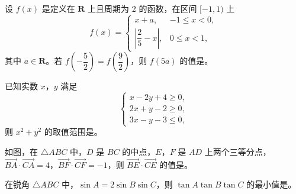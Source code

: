 \begin{question}
设 \(f(x)\) 是定义在 \(\mathbf{R}\) 上且周期为 2 的函数，在区间 \([-1,1)\) 上
\nopagebreak[4]
\[
f(x)=
\begin{cases}
x+a, & -1\leqslant x<0,\\
\left|\dfrac{2}{5}-x\right|, & 0\leqslant x<1,
\end{cases}
\]
其中 \(a\in\mathbf{R}\)。若 \(f\left(-\dfrac{5}{2}\right)=f\left(\dfrac{9}{2}\right)\)，则 \(f(5a)\) 的值是\gkblank{}。

\end{question}
\begin{question}
已知实数 \(x\)，\(y\) 满足
\nopagebreak[4]
\[
\begin{cases}
x-2y+4\geqslant 0,\\
2x+y-2\geqslant 0,\\
3x-y-3\leqslant 0,
\end{cases}
\]
则 \(x^{2}+y^{2}\) 的取值范围是\gkblank{}。

\Needspace{0.4\textheight}
\end{question}
\begin{question}
如图，在 \(\triangle ABC\) 中，\(D\) 是 \(BC\) 的中点，\(E\)，\(F\) 是 \(AD\) 上两个三等分点，\(\overrightarrow{BA}\cdot\overrightarrow{CA}=4\)，\(\overrightarrow{BF}\cdot\overrightarrow{CF}=-1\)，则 \(\overrightarrow{BE}\cdot\overrightarrow{CE}\) 的值是\gkblank{}。
\nopagebreak[4]
\begin{center}\end{center}
\nopagebreak[4]
\end{question}
\begin{question}
在锐角 \(\triangle ABC\) 中，\(\sin A=2\sin B\sin C\)，则 \(\tan A\tan B\tan C\) 的最小值是\gkblank{}。

\end{question}


